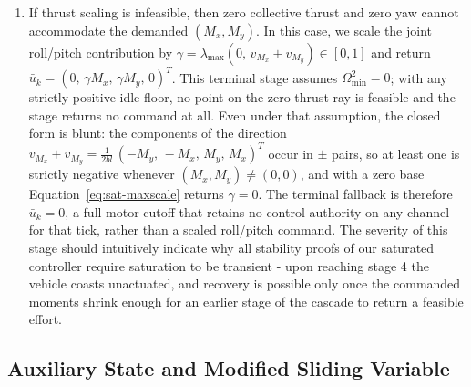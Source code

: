 \documentclass[conf]{new-aiaa}
\begin{document}
\begin{enumerate}
\item If thrust scaling is infeasible, then zero collective thrust and zero yaw cannot accommodate the demanded $(M_x, M_y)$. In this case, we scale the joint roll/pitch contribution by $\gamma = \lambda_{\max}(0,\, v_{M_x} + v_{M_y}) \in [0, 1]$ and return $\bar u_k = (0,\, \gamma M_x,\, \gamma M_y,\, 0)^T$. This terminal stage assumes $\Omega^2_{\min} = 0$; with any strictly positive idle floor, no point on the zero-thrust ray is feasible and the stage returns no command at all. Even under that assumption, the closed form is blunt: the components of the direction $v_{M_x} + v_{M_y} = \tfrac{1}{2 b l}\,(-M_y,\, -M_x,\, M_y,\, M_x)^T$ occur in $\pm$ pairs, so at least one is strictly negative whenever $(M_x, M_y) \neq (0, 0)$, and with a zero base Equation~\ref{eq:sat-maxscale} returns $\gamma = 0$. The terminal fallback is therefore $\bar u_k = 0$, a full motor cutoff that retains no control authority on any channel for that tick, rather than a scaled roll/pitch command. The severity of this stage should intuitively indicate why all stability proofs of our saturated controller require saturation to be transient - upon reaching stage 4 the vehicle coasts unactuated, and recovery is possible only once the commanded moments shrink enough for an earlier stage of the cascade to return a feasible effort.
\end{enumerate}

\subsection{Auxiliary State and Modified Sliding Variable}
\label{sec:sat-aux}
\end{document}
